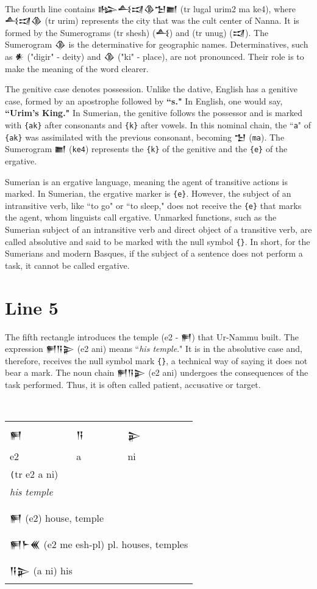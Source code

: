 \documentclass[a4paper,12pt]{book}
\newcommand{\fcn}{\setmainfont{Akkadian.otf}}
\begin{document}
\verb||\\
The fourth line contains {\fcn 𒈗𒋀𒀕𒆠𒈠𒆤}
(tr lugal urim2 ma ke4), where {\fcn 𒋀𒀕𒆠} (tr urim)
represents the city that was the cult center of Nanna.
It is formed by the Sumerograms (tr shesh) ({\fcn 𒋀})
and (tr unug) ({\fcn 𒀕}).
The Sumerogram {\fcn 𒆠} is the determinative
for geographic names. Determinatives,
such as {\fcn 𒀭} ("digir" - deity)
and {\fcn 𒆠} ("ki" - place), are not pronounced.
Their role is to make the meaning of the word clearer.

The genitive case denotes possession.
Unlike the dative, English has a genitive case,
formed by an apostrophe followed by {\bf ``s."}
In English, one would say, {\bf ``Urim's King."}
In Sumerian, the genitive follows the possessor
and is marked with \verb|{ak}| after consonants
and \verb|{k}| after vowels. In this nominal
chain, the ``\verb|a|" of \verb|{ak}| was
assimilated with the previous consonant,
becoming {\fcn 𒈠} (\verb|ma|).
The Sumerogram {\fcn 𒆤} (\verb|ke4|)
represents the \verb|{k}| of the genitive
and the \verb|{e}| of the ergative.

Sumerian is an ergative language, meaning the agent
of transitive actions is marked. In Sumerian, the
ergative marker is \verb|{e}|. However, the subject
of an intransitive verb, like ``to go" or ``to sleep,"
does not receive the \verb|{e}| that marks the agent,
whom linguists call ergative. Unmarked functions,
such as the Sumerian subject of an intransitive
verb and direct object of a transitive verb,
are called absolutive and said to be marked
with the null symbol \verb|{}|.
In short, for the Sumerians and
modern Basques, if the subject of a sentence
does not perform a task, it cannot be called ergative.

\section{Line 5}
The fifth rectangle introduces the
temple (e2 - {\fcn 𒂍}) that Ur-Nammu built.
The expression {\fcn 𒂍𒀀𒉌} (e2 ani)
means ``{\em his temple}." It is in the absolutive
case and, therefore, receives the null
symbol mark \verb|{}|, a technical way of
saying it does not bear a mark.
The noun chain {\fcn 𒂍𒀀𒉌} (e2 ani) undergoes
the consequences of the task performed.
Thus, it is often called patient, accusative or target.

\verb||\\
\begin{tabular}[!h]{l l l}
\fcn\Large 𒂍
&\fcn\Large 𒀀 &\fcn\Large 𒉌\\
  e2 & a & ni\\
\multicolumn{3}{l}{\texttt (tr e2 a ni)}\\
\multicolumn{3}{l}{\em his temple}\\
\hline\\
\multicolumn{3}{l}{{\fcn 𒂍}
  (e2) house, temple }\\
\multicolumn{3}{l}{{\fcn 𒂍𒈨𒌍} 
                    (e2 me esh-pl) pl. houses, temples }\\
\multicolumn{3}{l}{{\fcn 𒀀𒉌}
                    (a ni) his }\\
\end{tabular}
\index{e2 me esh-pl {\fcn 𒂍𒈨𒌍} ! houses}
\end{document}
